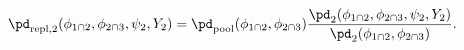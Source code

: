 \begin{equation}
  \pd_{\text{repl}, 2}(\phi_{1 \cap 2}, \phi_{2 \cap 3}, \psi_{2}, Y_{2}) = 
  \pd_{\text{pool}}(\phi_{1 \cap 2}, \phi_{2 \cap 3})
  \frac {
    \pd_{2} (\phi_{1 \cap 2}, \phi_{2 \cap 3}, \psi_{2}, Y_{2})
  } {
    \pd_{2}(\phi_{1 \cap 2}, \phi_{2 \cap 3})
  }.
  \label{eqn:submodel-two-marginal-replacement}
\end{equation}
